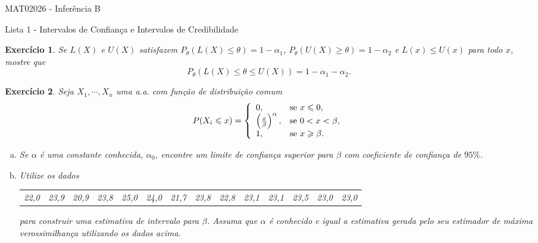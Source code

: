 \documentclass[letter,11pt]{article}
\newtheorem{exer}{Exercício}
\begin{document}
\begin{center}{ \Large MAT02026 - Inferência B }\end{center}

\begin{center}
{\large  \sc Lista 1 - Intervalos de Confiança e Intervalos de Credibilidade}
\end{center}
\vspace{5mm}

\begin{exer} \rm
Se $L(X)$ e $U(X)$ satisfazem $P_\theta(L(X)\leqslant\theta)=1-\alpha_1$, 
$P_\theta(U(X)\geqslant\theta)=1-\alpha_2$ e $L(x) \leqslant U(x)$ para todo 
$x$, mostre que
\[P_\theta(L(X)\leqslant\theta\leqslant U(X))=1-\alpha_1-\alpha_2.\]
\end{exer}



\begin{exer} \rm
Seja $X_1,\cdots,X_n$ uma a.a. com função de distribuição comum
\[P(X_i\leqslant x)=\left\{
                          \begin{array}{ll}
                            0, & \hbox{se }x\leqslant0, \\
                            \left(\frac{x}{\beta}\right)^\alpha, & \hbox{se }0<x<\beta, \\
                            1, & \hbox{se }x\geqslant\beta.
                          \end{array}
                        \right.
\]
\begin{enumerate}[a)]
  \item Se $\alpha$ é uma constante conhecida, $\alpha_0$, encontre um limite de confiança superior para $\beta$ com coeficiente de confiança de $95\%$.
  \item Utilize os dados
\begin{tabular}{cccccccccccccc}
 22,0 & 23,9 & 20,9 & 23,8 & 25,0 & 24,0 & 21,7 & 23,8 & 22,8 & 23,1 & 23,1 & 23,5 & 23,0 & 23,0 \\
\end{tabular}
\noindent para construir uma estimativa de intervalo para $\beta$. Assuma que $\alpha$ é conhecido e igual a estimativa gerada pelo seu estimador de máxima verossimilhança utilizando os dados acima.
\end{enumerate}
\end{exer}
\end{document}
